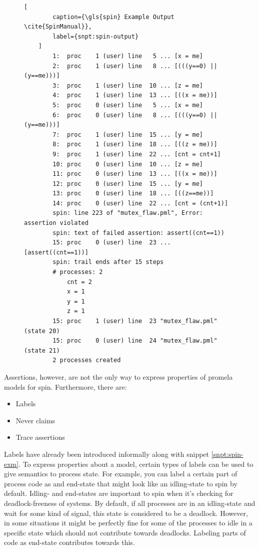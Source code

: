 \begin{figure}
    \begin{lstlisting}[
        caption={\gls{spin} Example Output \cite{SpinManual}},
        label={snpt:spin-output}
    ]
        1:  proc    1 (user) line   5 ... [x = me]
        2:  proc    1 (user) line   8 ... [(((y==0) || (y==me)))]
        3:  proc    1 (user) line  10 ... [z = me]
        4:  proc    1 (user) line  13 ... [((x = me))]
        5:  proc    0 (user) line   5 ... [x = me]
        6:  proc    0 (user) line   8 ... [(((y==0) || (y==me)))]
        7:  proc    1 (user) line  15 ... [y = me]
        8:  proc    1 (user) line  18 ... [((z = me))]
        9:  proc    1 (user) line  22 ... [cnt = cnt+1]
        10: proc    0 (user) line  10 ... [z = me]
        11: proc    0 (user) line  13 ... [((x = me))]
        12: proc    0 (user) line  15 ... [y = me]
        13: proc    0 (user) line  18 ... [((z==me))]
        14: proc    0 (user) line  22 ... [cnt = (cnt+1)]
        spin: line 223 of "mutex_flaw.pml", Error: assertion violated
        spin: text of failed assertion: assert((cnt==1))
        15: proc    0 (user) line  23 ... [assert((cnt==1))]
        spin: trail ends after 15 steps
        # processes: 2
            cnt = 2
            x = 1
            y = 1
            z = 1
        15: proc    1 (user) line  23 "mutex_flaw.pml" (state 20)
        15: proc    0 (user) line  24 "mutex_flaw.pml" (state 21)
        2 processes created
    \end{lstlisting}
\end{figure}

Assertions, however, are not the only way to express properties of \gls{promela} models for \gls{spin}.
Furthermore, there are:
\begin{itemize}
    \item Labels
    \item Never claims
    \item Trace assertions
\end{itemize}

Labels have already been introduced informally along with snippet \ref{snpt:spin-exm}.
To express properties about a model, certain types of labels can be used to give semantics to process state.
For example, you can label a certain part of process code as and end-state that might look like an idling-state to \gls{spin} by default.
Idling- and end-states are important to \gls{spin} when it's checking for deadlock-freeness of systems.
By default, if all processes are in an idling-state and wait for some kind of signal, this state is considered to be a deadlock.
However, in some situations it might be perfectly fine for some of the processes to idle in a specific state which should not contribute towards deadlocks.
Labeling parts of code as end-state contributes towards this.

